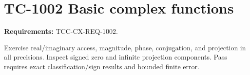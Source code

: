 \documentclass{article}
\begin{document}
\section*{TC-1002 Basic complex functions}
\textbf{Requirements:} TCC-CX-REQ-1002.

Exercise real/imaginary access, magnitude, phase, conjugation, and projection
in all precisions. Inspect signed zero and infinite projection components.
Pass requires exact classification/sign results and bounded finite error.
\end{document}
